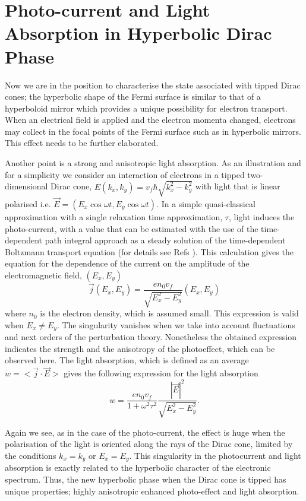 \documentclass[prb,twocolumn,aps,superscriptaddress,showpacs,floatfix]{revtex4}
\begin{document}

\section{Photo-current and Light Absorption in Hyperbolic Dirac Phase}
	Now we are in the position to characterise the state associated with tipped Dirac cones; the hyperbolic shape of the Fermi surface is similar to that of a hyperboloid mirror which provides a unique possibility for electron transport. When an electrical field is applied and the electron momenta changed, electrons may collect in the focal points of the Fermi surface such as in hyperbolic mirrors. This effect needs to be further elaborated.

	Another point is a strong and anisotropic light absorption. As an illustration and for a simplicity we consider an interaction of electrons in a tipped two-dimensional Dirac cone, $E(k_x,k_y)=v_f \hbar \sqrt{k_x^2-k_y^2}$  with light that is linear polarised i.e. $ \vec{E}=(E_x \cos {\omega t}, E_y \cos {\omega t})$. In a simple quasi-classical approximation with a single relaxation time approximation, $\tau$, light induces the photo-current, with a value that can be estimated with the use of the time-dependent path integral approach as a steady solution of the time-dependent Boltzmann transport equation (for details see Refs \cite{Budd,Mac,Hramov-2014}). This calculation gives the equation for the dependence of the current on the amplitude of the electromagnetic field, $(E_x , E_y)$
\begin{equation}
 \vec{j}(E_x, E_y)=\frac{e n_0 v_f}{\sqrt{E_x^2-E_y^2}}  (E_x , E_y)
\end{equation}
where $n_0$ is the electron density, which is assumed small. This expression is valid when $ E_x\neq E_y$. The singularity vanishes when we take into account  fluctuations and next orders of the perturbation theory. Nonetheless the obtained expression indicates the strength and the anisotropy of the photoeffect, which can be observed here. The light absorption, which is defined as an average $w=< \vec{j}\cdot\vec{E}>$ gives the following expression for the light absorption
\begin{equation}
w=\frac{e n_0  v_f}{1+\omega^2\tau^2}  \frac{ |\vec{E}|^2}{\sqrt{E_x^2-E_y^2}}. 
\end{equation}

	Again we see, as in the case of the photo-current, the effect is huge when the polarisation of the light is oriented along the rays of the Dirac cone, limited by the conditions $k_x=k_y$ or $E_x=E_y$. This singularity in the photocurrent and light absorption is exactly related to the hyperbolic character of the electronic spectrum. Thus, the new hyperbolic phase when the Dirac cone is tipped has unique properties; highly anisotropic enhanced photo-effect and light absorption.
\end{document}
